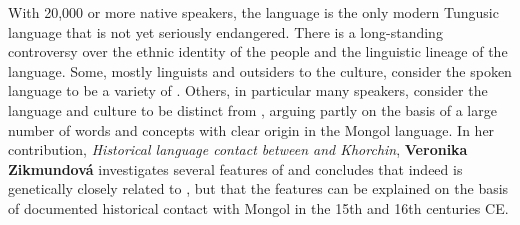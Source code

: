 \documentclass[output=paper,colorlinks,citecolor=brown]{langscibook}
\begin{document}
With 20,000 or more native speakers, the  language  is the only modern Tungusic language that is not yet seriously endangered. There is a long-standing controversy over the ethnic identity of the  people and the linguistic lineage of the  language. Some, mostly linguists and outsiders to the culture, consider the spoken language to be a variety of . Others, in particular many  speakers, consider the language and culture to be distinct from , arguing partly on the basis of a large number of words and concepts with clear origin in the  Mongol language. In her contribution, \textit{Historical language contact between  and Khorchin}, \textbf{Veronika} \textbf{Zikmundová} investigates several  features of  and concludes that indeed  is genetically closely related to , but that the  features can be explained on the basis of documented historical contact with  Mongol in the 15th and 16th centuries CE.
  




{\sloppy\printbibliography[heading=subbibliography,notkeyword=this]}
\end{document}
